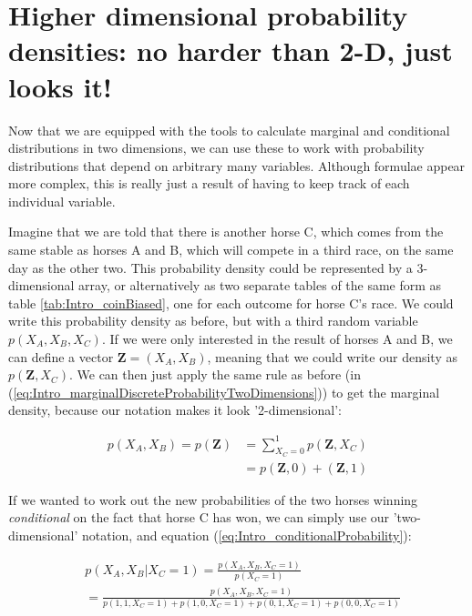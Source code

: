\documentclass[11pt,fullpage]{book}
\begin{document}
\section{Higher dimensional probability densities: no harder than 2-D, just looks it!}
Now that we are equipped with the tools to calculate marginal and conditional distributions in two dimensions, we can use these to work with probability distributions that depend on arbitrary many variables. Although formulae appear more complex, this is really just a result of having to keep track of each individual variable.

Imagine that we are told that there is another horse C, which comes from the same stable as horses A and B, which will compete in a third race, on the same day as the other two. This probability density could be represented by a 3-dimensional array, or alternatively as two separate tables of the same form as table \ref{tab:Intro_coinBiased}, one for each outcome for horse C's race. We could write this probability density as before, but with a third random variable $p(X_A,X_B,X_C)$. If we were only interested in the result of horses A and B, we can define a vector $\boldsymbol{Z}=(X_A,X_B)$, meaning that we could write our density as $p(\boldsymbol{Z},X_C)$. We can then just apply the same rule as before (in (\ref{eq:Intro_marginalDiscreteProbabilityTwoDimensions})) to get the marginal density, because our notation makes it look '2-dimensional':

\begin{equation}\label{eq:Intro_3DDiscreteHorsesExample}
\begin{align}
p(X_A,X_B) = p(\boldsymbol{Z}) &= \sum\limits_{X_C=0}^{1} p(\boldsymbol{Z},X_C)\\
&= p(\boldsymbol{Z},0) + (\boldsymbol{Z},1)
\end{align}
\end{equation}

If we wanted to work out the new probabilities of the two horses winning \textit{conditional} on the fact that horse C has won, we can simply use our 'two-dimensional' notation, and equation (\ref{eq:Intro_conditionalProbability}):

\begin{equation}
\begin{align}
&p(X_A, X_B|X_C=1) = \frac{p(X_A,X_B,X_C=1)}{p(X_C=1)}\\
&= \frac{p(X_A,X_B,X_C=1)}{p(1,1,X_C=1) + p(1,0,X_C=1) + p(0,1,X_C=1) + p(0,0,X_C=1)}
\end{align}
\end{equation}
\end{document}
